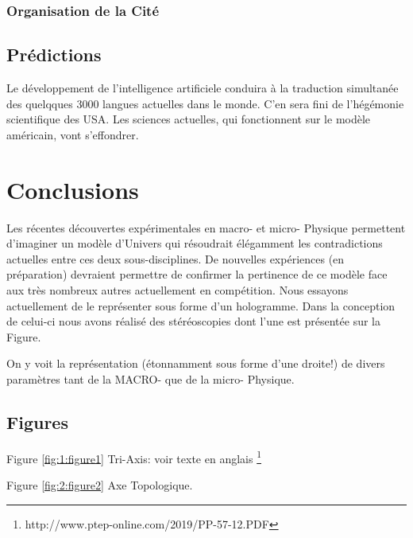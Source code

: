 \documentclass[a4paper,12pt]{article}
\begin{document}
\subsubsection {Organisation de la Cité}


\subsection {Prédictions}
Le développement de l'intelligence artificiele conduira à la traduction simultanée des quelqques 3000 langues actuelles dans le monde. C'en sera fini de l'hégémonie scientifique des USA.
Les sciences actuelles, qui fonctionnent sur le modèle américain, vont s'effondrer. 









\section{Conclusions}
\label{sec:headings}

Les récentes découvertes expérimentales en macro- et micro- Physique permettent d'imaginer un modèle d'Univers qui résoudrait élégamment les contradictions actuelles entre ces deux sous-disciplines. De nouvelles expériences (en préparation) devraient permettre de confirmer la pertinence de ce modèle face aux très nombreux autres actuellement en compétition. Nous essayons actuellement de le représenter sous forme d'un hologramme. Dans la conception de celui-ci nous avons réalisé des stéréoscopies dont l'une est présentée sur la Figure.

On y voit la représentation (étonnamment sous forme d'une droite!) de divers paramètres tant de la MACRO- que de la micro- Physique.


\subsection{Figures}

Figure \ref{fig:1:figure1} Tri-Axis: voir texte en anglais \footnote{http://www.ptep-online.com/2019/PP-57-12.PDF}

Figure \ref{fig:2:figure2} Axe Topologique.
\end{document}

